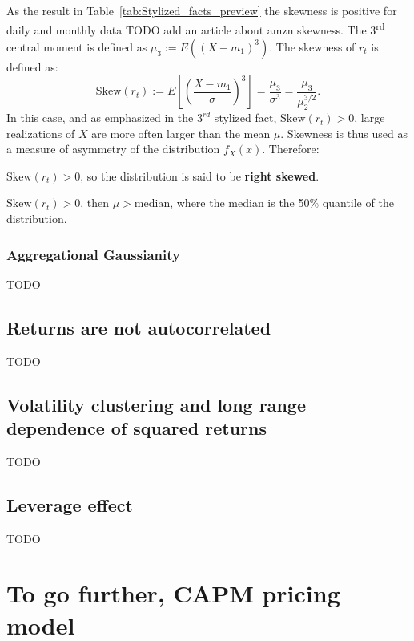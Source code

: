 \documentclass{article}
\begin{document}
\noindent As the result in Table~\ref{tab:Stylized_facts_preview} 
the skewness is positive for daily and monthly data \cite{Skewness} TODO add an article about amzn skewness.
The 3\textsuperscript{rd} central moment is defined as
$\mu_3 := E((X - m_1)^3).$ The skewness of \( r_t \) is defined as:
\[
\text{Skew}(r_t) := E \left[ \left( \frac{X - m_1}{\sigma} \right)^3 \right] = \frac{\mu_3}{\sigma^3} = \frac{\mu_3}{\mu_2^{3/2}}.
\]
In this case, and as emphasized in the $3^{rd}$ stylized fact, \( \text{Skew}(r_t) >0 \), large realizations of \( X \) are more often larger
than the mean \( \mu \). 
Skewness is thus used as a measure of asymmetry of the distribution \( f_X(x) \). Therefore:
 
\( \text{Skew}(r_t) > 0 \), so the distribution is said to be \textbf{right skewed}. 

\( \text{Skew}(r_t) > 0 \), then \( \mu > \text{median} \), where the median is the 50\% quantile of the distribution.

\subsubsection{Aggregational Gaussianity}
TODO
\subsection{Returns are not autocorrelated}
TODO
\subsection{Volatility clustering and long range dependence of squared returns}
TODO
\subsection{Leverage effect}
TODO

\appendix



\section{To go further, CAPM pricing model}


\end{document}
